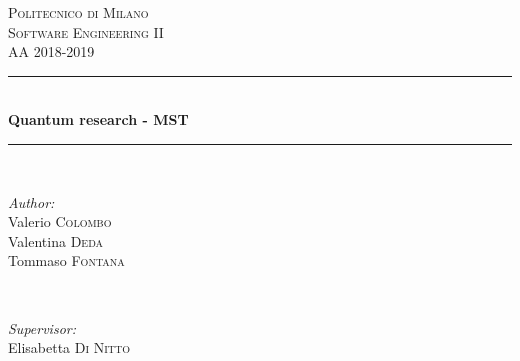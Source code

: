\documentclass[12pt]{article}
\theoremstyle{definition}
\begin{document}
\begin{titlepage}

\newcommand{\HRule}{\rule{\linewidth}{0.5mm}} %

\center %
 

\textsc{\LARGE Politecnico di Milano}\\[1.5cm] %
\textsc{\Large Software Engineering II}\\[0.5cm] %
\textsc{\large AA 2018-2019}\\[0.5cm] %


\HRule \\[0.4cm]
{ \huge \bfseries Quantum research - MST}\\[0.4cm] %
\HRule \\[1.5cm]
 

\begin{minipage}{0.4\textwidth}
\begin{flushleft} \large
\emph{Author:}\\
Valerio \textsc{Colombo}\\
Valentina \textsc{Deda}\\
Tommaso \textsc{Fontana}
\end{flushleft}
\end{minipage}
~
\begin{minipage}{0.4\textwidth}
\begin{flushright} \large
\emph{Supervisor:} \\
Elisabetta \textsc{Di Nitto} %
\end{flushright}

\end{minipage}\\[2cm]


\end{titlepage}
\end{document}
